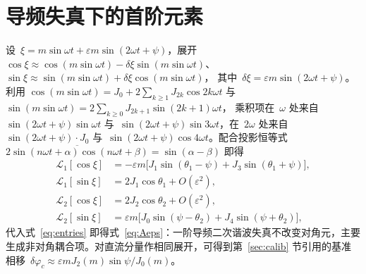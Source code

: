 \documentclass[11pt,journal,onecolumn]{IEEEtran}
\theoremstyle{plain}
\theoremstyle{remark}
\newcommand{\Lc}{\mathcal{L}}
\begin{document}
\section{导频失真下的首阶元素}
\label{app:eps}
设~$\xi=m\sin\omega t+\varepsilon m\sin(2\omega t+\psi)$，展开
$\cos\xi\approx\cos(m\sin\omega t)-\delta\xi\sin(m\sin\omega t)$、
$\sin\xi\approx\sin(m\sin\omega t)+\delta\xi\cos(m\sin\omega t)$，
其中~$\delta\xi=\varepsilon m\sin(2\omega t+\psi)$。利用
$\cos(m\sin\omega t)=J_0+2\sum_{k\ge1}J_{2k}\cos2k\omega t$ 与
$\sin(m\sin\omega t)=2\sum_{k\ge0}J_{2k+1}\sin(2k{+}1)\omega t$，
乘积项在~$\omega$ 处来自~$\sin(2\omega t{+}\psi)\sin\omega t$ 与~$\sin(2\omega t{+}\psi)\sin3\omega t$，在~$2\omega$ 处来自~$\sin(2\omega t{+}\psi)\cdot J_0$ 与~$\sin(2\omega t{+}\psi)\cos4\omega t$。配合投影恒等式
$\overline{2\sin(n\omega t{+}\alpha)\cos(n\omega t{+}\beta)}=\sin(\alpha-\beta)$
即得
\begin{align}
\Lc_1[\cos\xi]&=-\varepsilon m\bigl[J_1\sin(\theta_1{-}\psi)
+J_3\sin(\theta_1{+}\psi)\bigr],\nonumber\\
\Lc_1[\sin\xi]&=2J_1\cos\theta_1+O(\varepsilon^2),\nonumber\\
\Lc_2[\cos\xi]&=2J_2\cos\theta_2+O(\varepsilon^2),\nonumber\\
\Lc_2[\sin\xi]&=\varepsilon m\bigl[J_0\sin(\psi{-}\theta_2)
+J_4\sin(\psi{+}\theta_2)\bigr],
\end{align}
代入式~\eqref{eq:entries} 即得式~\eqref{eq:Aeps}：一阶导频二次谐波失真不改变对角元，主要生成非对角耦合项。对直流分量作相同展开，可得到第~\ref{sec:calib} 节引用的基准相移~$\delta\varphi_c\approx\varepsilon mJ_2(m)\sin\psi/J_0(m)$。
\end{document}
